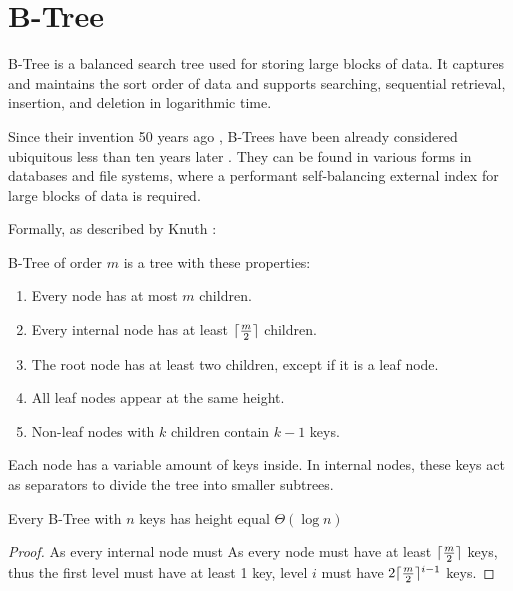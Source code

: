 \section{B-Tree}

B-Tree is a balanced search tree used for storing large blocks of data. It captures and maintains the sort order of data and supports searching, sequential retrieval, insertion, and deletion in logarithmic time.

Since their invention 50 years ago \cite{bayer-org}, B-Trees have been already considered ubiquitous less than ten years later \cite{10.1145/356770.356776}. They can be found in various forms in databases and file systems, where a performant self-balancing external index for large blocks of data is required.

Formally, as described by Knuth \cite{knuth1998art}:

\begin{definition}\label{def:btree}
  B-Tree of order $m$ is a tree with these properties:
  \begin{enumerate}
    \item Every node has at most $m$ children.
    \item Every internal node has at least $\lceil\frac{m}{2}\rceil$ children.
    \item The root node has at least two children, except if it is a leaf node.
    \item All leaf nodes appear at the same height.
    \item Non-leaf nodes with $k$ children contain $k - 1$ keys.
  \end{enumerate}
\end{definition}


Each node has a variable amount of keys inside. In internal nodes, these keys act as separators to divide the tree into smaller subtrees.




\begin{lemma}
  Every B-Tree with $n$ keys has height equal $\Theta(\log{n})$
\end{lemma}

\begin{proof}
  As every internal node must
  As every node must have at least $\lceil\frac{m}{2}\rceil$ keys, thus the first level must have at least 1 key, level $i$ must have $2\lceil\frac{m}{2}\rceil^{i-1}$ keys.
\end{proof}

